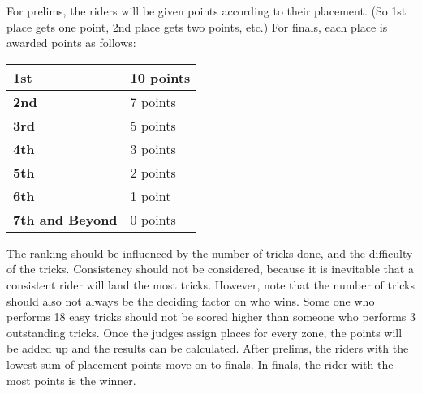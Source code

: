 For prelims, the riders will be given points according to their placement.
(So 1st place gets one point, 2nd place gets two points, etc.)
For finals, each place is awarded points as follows:

\begin{tabular}{|l|l|}
\hline
\textbf{1st}&  10 points\\
\hline
\textbf{2nd}& 7 points\\
\hline
\textbf{3rd}& 5 points\\
\hline
\textbf{4th}& 3 points\\
\hline
\textbf{5th}& 2 points\\
\hline
\textbf{6th}& 1 point\\ 
\hline
\textbf{7th and Beyond}& 0 points \\
\hline
\end{tabular}

The ranking should be influenced by the number of tricks done, and the difficulty of the tricks.
Consistency should not be considered, because it is inevitable that a consistent rider will land the most tricks.
However, note that the number of tricks
should also not always be the deciding factor on who wins.
Some one who performs 18 easy tricks should not be scored higher than someone who performs 3 outstanding tricks.
Once the judges assign places for every zone, the points will be added up and the results can be calculated.
After prelims, the riders with the lowest sum of placement points move on to finals.
In finals, the rider with the most points is the winner.
